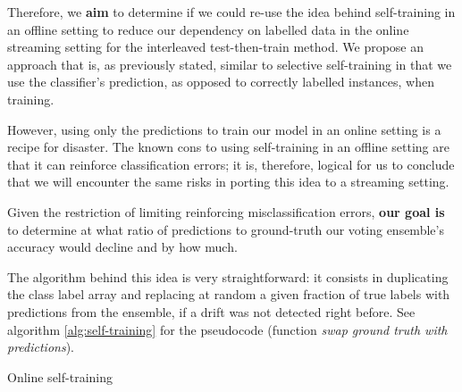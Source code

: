 Therefore, we \textbf{aim} to determine if we could re-use the idea behind self-training in an offline setting to reduce our dependency on labelled data in the online streaming setting for the interleaved test-then-train method. We propose an approach that is, as previously stated, similar to selective self-training in that we use the classifier's prediction, as opposed to correctly labelled instances, when training.

However, using only the predictions to train our model in an online setting is a recipe for disaster. The known cons to using self-training in an offline setting are that it can reinforce classification errors; it is, therefore, logical for us to conclude that we will encounter the same risks in porting this idea to a streaming setting.

Given the restriction of limiting reinforcing misclassification errors, \textbf{our goal is} to determine at what ratio of predictions to ground-truth our voting ensemble's accuracy would decline and by how much.

The algorithm behind this idea is very straightforward: it consists in duplicating the class label array and replacing at random a given fraction of true labels with predictions from the ensemble, if a drift was not detected right before. See algorithm \ref{alg:self-training} for the pseudocode (function \textit{swap ground truth with predictions}).

\begin{algorithm}

\caption{\label{alg:self-training}Online self-training}
\end{algorithm}


